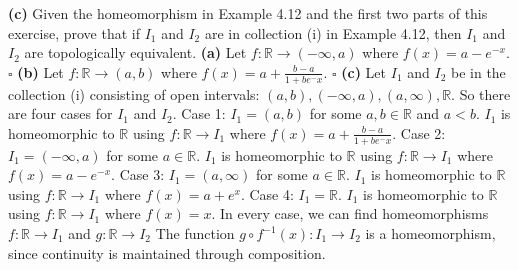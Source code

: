 \documentclass[12pt]{article}
\begin{document}
\newline
\textbf{(c)} Given the homeomorphism in Example 4.12 and the first two parts of this exercise, prove that if \(I_1\) and \(I_2\) are in collection (i) in Example 4.12, then \(I_1\) and \(I_2\) are topologically equivalent.
\newline \newline
\textbf{(a)} Let \(f:\mathbb{R} \rightarrow (-\infty, a)\) where \(f(x) = a - e^{-x}\).
\newline \(\square\) \newline
\textbf{(b)} Let \(f:\mathbb{R} \rightarrow (a,b)\) where \(f(x) = a + \frac{b-a}{1+be^-x}\).
\newline \(\square\) \newline
\textbf{(c)} Let \(I_1\) and \(I_2\) be in the collection (i) consisting of open intervals: \((a,b), (-\infty,a), (a,\infty), \mathbb{R}\).
\newline
So there are four cases for \(I_1\) and \(I_2\).
\newline \newline
Case 1: \(I_1 = (a,b)\) for some \(a,b\in \mathbb{R}\) and \(a<b\).
\newline
\(I_1\) is homeomorphic to \(\mathbb{R}\) using \(f:\mathbb{R} \rightarrow I_1\) where \(f(x) = a + \frac{b-a}{1+be^-x}\).
\newline \newline
Case 2: \(I_1 = (-\infty, a)\) for some \(a \in \mathbb{R}\).
\newline
\(I_1\) is homeomorphic to \(\mathbb{R}\) using \(f:\mathbb{R} \rightarrow I_1\) where \(f(x) = a - e^{-x}\).
\newline \newline
Case 3: \(I_1 = (a, \infty)\) for some \(a \in \mathbb{R}\).
\newline
\(I_1\) is homeomorphic to \(\mathbb{R}\) using \(f:\mathbb{R} \rightarrow I_1\) where \(f(x) = a + e^{x}\).
\newline \newline
Case 4: \(I_1 = \mathbb{R}\).
\newline
\(I_1\) is homeomorphic to \(\mathbb{R}\) using \(f:\mathbb{R} \rightarrow I_1\) where \(f(x) = x\).
\newline
\newline
In every case, we can find homeomorphisms \(f:\mathbb{R} \rightarrow I_1\) and \(g:\mathbb{R} \rightarrow I_2\)
\newline \newline
The function \(g \circ f^{-1} (x): I_1 \rightarrow I_2\) is a homeomorphism, since continuity is maintained through composition.
\end{document}
